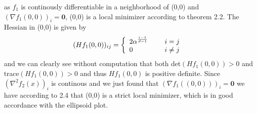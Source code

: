 \documentclass[a4paper]{article}
\newcommand{\bt}{\textbf}
\begin{document}
as $f_1$ is continously differentiable in a neighborhood of (0,0) and $(\nabla f_1(0,0))_i = \bt{0}$, (0,0) is a local minimizer according to theorem 2.2. The Hessian in (0,0) is given by
\begin{align*}
  (Hf_1(0,0))_{ij} =
  \left\{
  \begin{array}{ll}
    2 \alpha^{\frac{i-1}{d-1}} \hspace*{5mm}  & i=j\\
    0                                     & i\neq j
  \end{array}
  \right.
\end{align*}
and we can clearly see without computation that both det$(Hf_1(0,0))>0$ and trace$(Hf_1(0,0))>0$ and thus $Hf_1(0,0)$ is positive definite. Since $(\nabla^2 f_2(x))_i$ is continous and we just found that $(\nabla f_1((0,0)))_i = \bt{0}$ we have according to 2.4 that (0,0) is a strict local minimizer, which is in good accordance with the ellipsoid plot.
\end{document}
